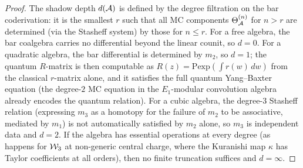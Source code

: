 \begin{proof}
The shadow depth $d(\mathcal{A})$ is defined by the degree filtration on
the bar coderivation: it is the smallest $r$ such that all MC
components $\Theta^{(n)}_{\mathcal{A}}$ for $n>r$ are determined
(via the Stasheff system) by those for $n\le r$. For a free
algebra, the bar coalgebra carries no differential beyond the
linear counit, so $d=0$. For a quadratic algebra, the bar
differential is determined by $m_2$, so $d=1$; the quantum
$R$-matrix is then computable as $R(z)=\mathrm{Pexp}(\int r(w)\,dw)$
from the classical $r$-matrix alone, and it satisfies the full
quantum Yang--Baxter equation (the degree-$2$ MC equation in the
$E_1$-modular convolution algebra already encodes the quantum
relation).
For a cubic algebra, the degree-$3$ Stasheff relation (expressing $m_3$ as a homotopy for the failure of $m_2$ to be
associative, mediated by $m_1$) is not automatically satisfied
by $m_2$ alone, so $m_3$ is
independent data and $d=2$. If the algebra has essential
operations at every degree (as happens for $\mathcal{W}_3$ at
non-generic central charge, where the Kuranishi map $\kappa$ has
Taylor coefficients at all orders), then no finite truncation
suffices and $d=\infty$.
\end{proof}

